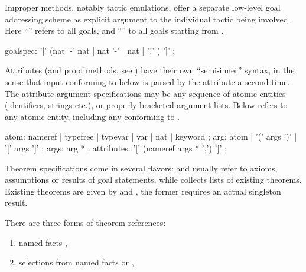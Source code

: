 \begin{isabellebody}
\begin{isamarkuptext}
  Improper methods, notably tactic emulations, offer a separate
  low-level goal addressing scheme as explicit argument to the
  individual tactic being involved.  Here ``\isa{{\isacharbrackleft}{\isacharbang}{\isacharbrackright}}'' refers to
  all goals, and ``'' to all goals starting from .

  \begin{rail}
    goalspec: '[' (nat '-' nat | nat '-' | nat | '!' ) ']'
    ;
  \end{rail}%
\end{isamarkuptext}%
\isamarkuptrue%
%
\isamarkuptrue%
%
\begin{isamarkuptext}%
Attributes (and proof methods, see ) have their
  own ``semi-inner'' syntax, in the sense that input conforming to
   below is parsed by the attribute a second time.
  The attribute argument specifications may be any sequence of atomic
  entities (identifiers, strings etc.), or properly bracketed argument
  lists.  Below  refers to any atomic entity, including
  any  conforming to .

  \begin{rail}
    atom: nameref | typefree | typevar | var | nat | keyword
    ;
    arg: atom | '(' args ')' | '[' args ']'
    ;
    args: arg *
    ;
    attributes: '[' (nameref args * ',') ']'
    ;
  \end{rail}

  Theorem specifications come in several flavors:
   and  usually refer to
  axioms, assumptions or results of goal statements, while
   collects lists of existing theorems.  Existing
  theorems are given by  and
  , the former requires an actual singleton
  result.

  There are three forms of theorem references:
  \begin{enumerate}
  
  \item named facts ,

  \item selections from named facts  or ,


\end{enumerate}
\end{isamarkuptext}
\end{isabellebody}
